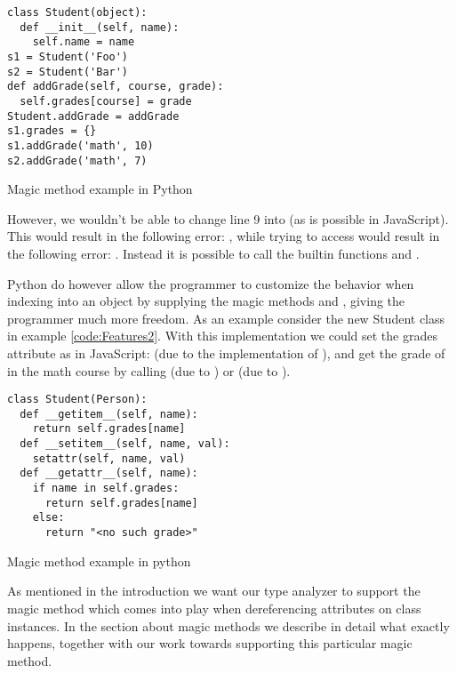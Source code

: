 \begin{listing}[H]
  \begin{verbatim}
class Student(object):
  def __init__(self, name):
    self.name = name
s1 = Student('Foo')
s2 = Student('Bar')
def addGrade(self, course, grade):
  self.grades[course] = grade
Student.addGrade = addGrade
s1.grades = {}
s1.addGrade('math', 10)
s2.addGrade('math', 7)
  \end{verbatim}
  \caption{Magic method example in Python}
  \label{code:Features1}
\end{listing}

However, we wouldn't be able to change line 9 into  (as is possible in JavaScript). This would result in the following error: 
, while trying to access  would result in the following error: 
. Instead it is possible to call the builtin functions 
 and .

Python do however allow the programmer to customize the behavior when indexing into an object by supplying the magic methods
 and , giving the programmer much more freedom. 
As an example consider the new Student class in example \ref{code:Features2}. 
With this implementation we could set the grades attribute as in JavaScript:  (due to the implementation of ), 
and get the grade of  in the math course by calling  (due to ) or  (due to ).

\begin{listing}[H]
\begin{verbatim}
class Student(Person):
  def __getitem__(self, name):
    return self.grades[name]
  def __setitem__(self, name, val):
    setattr(self, name, val)
  def __getattr__(self, name):
    if name in self.grades:
      return self.grades[name]
    else:
      return "<no such grade>"
\end{verbatim}
	\caption{Magic method example in python}
	\label{code:Features2}
\end{listing}

As mentioned in the introduction we want our type analyzer to support the magic method  which comes into play when dereferencing attributes on class instances. In the section about magic methods we describe in detail what exactly happens, together with our work towards supporting this particular magic method.
